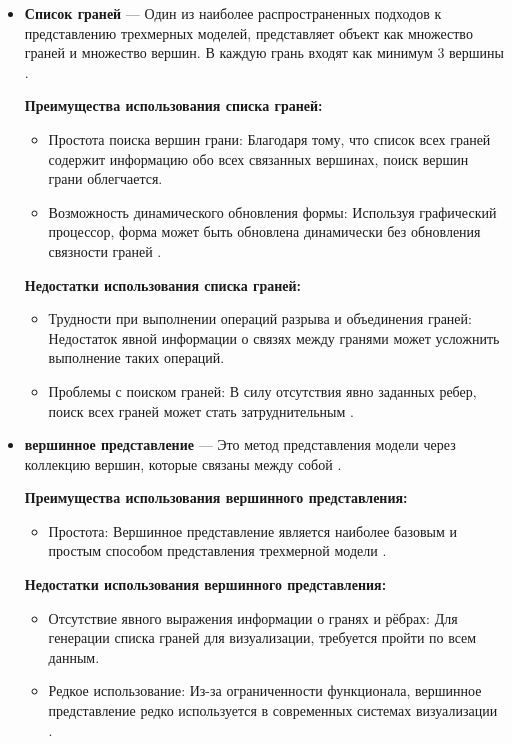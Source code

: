 	\begin{itemize}
    \item \textbf{Список граней} ---  Один из наиболее распространенных подходов к представлению трехмерных моделей, представляет объект как множество граней и множество вершин. В каждую грань входят как минимум 3 вершины \cite{polygon_mesh}.
    
  \textbf{Преимущества использования списка граней:}
  
	\begin{itemize}
		\item Простота поиска вершин грани: Благодаря тому, что список всех граней содержит информацию обо всех связанных вершинах, поиск вершин грани облегчается.
		\item Возможность динамического обновления формы: Используя графический процессор, форма может быть обновлена динамически без обновления связности граней \cite{polygon_mesh}.
		\end{itemize}
		
	\textbf{Недостатки использования списка граней:}
	
	\begin{itemize}
	\item Трудности при выполнении операций разрыва и объединения граней: Недостаток явной информации о связях между гранями может усложнить выполнение таких операций.
	\item Проблемы с поиском граней: В силу отсутствия явно заданных ребер, поиск всех граней может стать затруднительным \cite{polygon_mesh}.
	\end{itemize}
	
	\item \textbf{вершинное представление} --- Это метод представления модели через коллекцию вершин, которые связаны между собой \cite{polygon_mesh}.

	\textbf{Преимущества использования вершинного представления:}
	
	\begin{itemize}
		\item Простота: Вершинное представление является наиболее базовым и простым способом представления трехмерной модели \cite{polygon_mesh}.
	\end{itemize}

	\textbf{Недостатки использования вершинного представления:}

	\begin{itemize}
		\item Отсутствие явного выражения информации о гранях и рёбрах: Для генерации списка граней для визуализации, требуется пройти по всем данным.
		\item Редкое использование: Из-за ограниченности функционала, вершинное представление редко используется в современных системах визуализации \cite{polygon_mesh}.
	\end{itemize}
	

\end{itemize}
